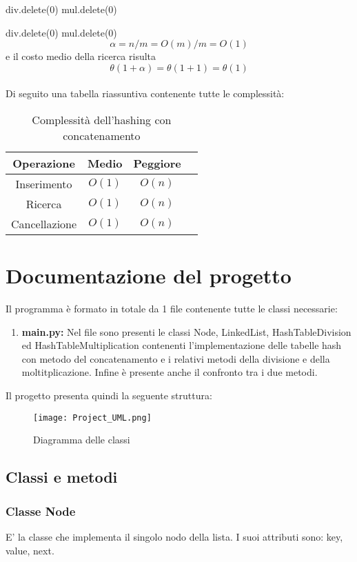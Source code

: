 \documentclass{article}
\begin{document}
    div.delete(0)
    mul.delete(0)

    div.delete(0)
    mul.delete(0) \[\alpha = n/m = O(m)/m = O(1)\]
e il costo medio della ricerca risulta
\[\theta(1 + \alpha) = \theta(1 + 1) = \theta(1)\] \\

Di seguito una tabella riassuntiva contenente tutte le complessità:
\begin{table}[!hb]
    \centering
    \begin{tabular}{cccc}
    Operazione & Medio & Peggiore \\
    \hline
    Inserimento & $O(1)$ & $O(n)$ \\
    Ricerca & $O(1)$ & $O(n)$ \\
    Cancellazione & $O(1)$ & $O(n)$ \\
    \end{tabular}
    \caption{Complessità dell'hashing con concatenamento}
    \label{tab:ComplexityChainingHash}
\end{table}

\clearpage

\section{Documentazione del progetto}
Il programma è formato in totale da 1 file contenente tutte le classi necessarie:
\begin{enumerate}[label={\roman*.)}, ref={\roman*.)}]
    \item \textbf{main.py:} Nel file sono presenti le classi Node, LinkedList, HashTableDivision ed HashTableMultiplication contenenti l'implementazione delle tabelle hash con metodo del concatenamento e i relativi metodi della divisione e della moltitplicazione. Infine è presente anche il confronto tra i due metodi.
\end{enumerate}

Il progetto presenta quindi la seguente struttura:
\begin{figure}[!hb]
        \centering
        \texttt{[image: Project\_UML.png]}
        \caption{Diagramma delle classi}
        \label{fig:Project_UML}
\end{figure}

\subsection{Classi e metodi}
\subsubsection{Classe Node}
E' la classe che implementa il singolo nodo della lista.
I suoi attributi sono: key, value, next.
\end{document}
